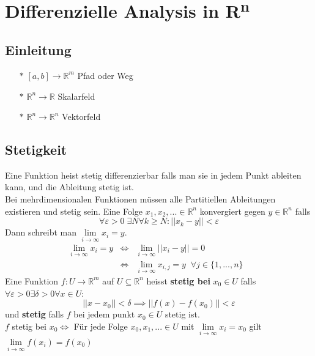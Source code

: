\section{Differenzielle Analysis in R\textsuperscript{n}}
\subsection{Einleitung}
  \begin{itemize}
    \item[$*$] $[a,b]\rightarrow\mathbb R^m$ Pfad oder Weg
    \item[$*$] $\mathbb R^n\rightarrow\mathbb R$ Skalarfeld
    \item[$*$] $\mathbb R^n\rightarrow\mathbb R^n$ Vektorfeld
  \end{itemize}
\subsection{Stetigkeit}
    Eine Funktion heist stetig differenzierbar falls man sie in jedem Punkt 
    ableiten kann, und die Ableitung stetig ist. \\
    Bei mehrdimensionalen Funktionen müssen alle Partitiellen Ableitungen existieren und stetig sein.
    Eine Folge $x_1,x_2,...\in\mathbb R^n$ konvergiert gegen $y\in\mathbb R^n$
    falls 
    $$
      \forall\varepsilon>0\;\exists N\forall k\geq N: ||x_k-y||<\varepsilon
    $$
    Dann schreibt man $\lim\limits_{i\rightarrow\infty}x_i=y$.\\
    $$\begin{array}{lclr}
      \lim\limits_{i\rightarrow\infty}x_i=y&\iff&\lim\limits_{i\rightarrow\infty}||x_i-y||=0&\\
      &\iff&\lim\limits_{i\rightarrow\infty}x_{i,j}=y\;\;\forall j\in\{1,...,n\}
    \end{array}$$
    Eine Funktion $f:U\rightarrow \mathbb R^m$ auf $U\subseteq\mathbb R^n$
    heisst \textbf{stetig bei} $x_0\in U$ falls
    $\forall\varepsilon>0\exists\delta>0\forall x\in U:$
    $$||x-x_0||<\delta\implies||f(x)-f(x_0)||<\varepsilon$$
    und \textbf{stetig} falls $f$ bei jedem punkt $x_0\in U$ stetig ist.\\
    $f$ stetig bei $x_0\iff$ Für jede Folge $x_0,x_1,...\in U$ mit
    $\lim\limits_{i\rightarrow\infty}x_i=x_0$ gilt
    $\lim\limits_{i\rightarrow\infty}f(x_i)=f(x_0)$\\
